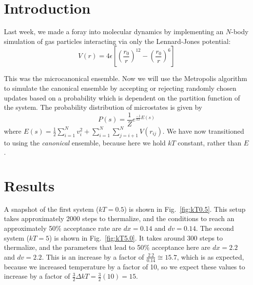 \documentclass{article}
\author{\hwauthor}
\title{\hwtitle}
\date{\hwdate}
\begin{document}
\maketitle
\thispagestyle{fancy}

\section{Introduction}

Last week, we made a foray into molecular dynamics by implementing an $N$-body simulation of gas particles interacting via only the Lennard-Jones potential: \begin{equation}
   V(r)=4\epsilon\left[\left(\frac{r_0}{r}\right)^{12} - \left(\frac{r_0}{r}\right)^6\right]
\end{equation}

This was the microcanonical ensemble. Now we will use the Metropolis algorithm to simulate the canonical ensemble by accepting or rejecting randomly chosen updates based on a probability which is dependent on the partition function of the system. The probability distribution of microstates is given by \begin{equation}
   P(s)=\frac{1}{Z}e^{\frac{-1}{kT}E(s)}
\end{equation}
where $\displaystyle E(s)=\frac{1}{2}\sum_{i=1}^{N} v_{i}^2 + \sum_{i=1}^{N} \sum_{j=i+1}^{N} V(r_{ij})$. We have now transitioned to using the \emph{canonical} ensemble, because here we hold $kT$ constant, rather than $E$.

\section{Results}

\bigskip
{}
\medskip

A snapshot of the first system ($kT=0.5$) is shown in Fig.~\ref{fig:kT0.5}. This setup takes approximately 2000 steps to thermalize, and the conditions to reach an approximately 50\% acceptance rate are $dx=0.14$ and $dv=0.14$. The second system ($kT=5$) is shown in Fig.~\ref{fig:kT5.0}. It takes around 300 steps to thermalize, and the parameters that lead to 50\% acceptance here are $dx=2.2$ and $dv=2.2$. This is an increase by a factor of $\frac{2.2}{0.14}\cong15.7$, which is as expected, because we increased temperature by a factor of 10, so we expect these values to increase by a factor of $\frac{3}{2}\Delta kT=\frac{3}{2}(10)=15$.
\end{document}
